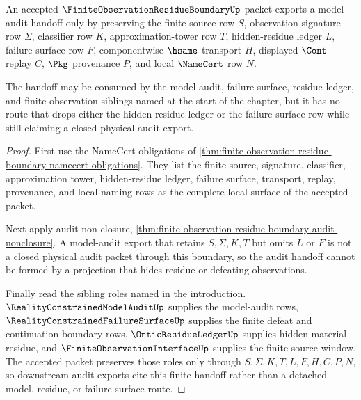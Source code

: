 \begin{theorem}
\label{thm:finite-observation-residue-boundary-audit-handoff}
An accepted $\FiniteObservationResidueBoundaryUp$ packet exports a model-audit handoff only by preserving the finite source row $S$, observation-signature row $\Sigma$, classifier row $K$, approximation-tower row $T$, hidden-residue ledger $L$, failure-surface row $F$, componentwise $\hsame$ transport $H$, displayed $\Cont$ replay $C$, $\Pkg$ provenance $P$, and local $\NameCert$ row $N$.

The handoff may be consumed by the model-audit, failure-surface, residue-ledger, and finite-observation siblings named at the start of the chapter, but it has no route that drops either the hidden-residue ledger or the failure-surface row while still claiming a closed physical audit export.
\end{theorem}
\begin{proof}
First use the NameCert obligations of \autoref{thm:finite-observation-residue-boundary-namecert-obligations}. They list the finite source, signature, classifier, approximation tower, hidden-residue ledger, failure surface, transport, replay, provenance, and local naming rows as the complete local surface of the accepted packet.

Next apply audit non-closure, \autoref{thm:finite-observation-residue-boundary-audit-nonclosure}. A model-audit export that retains $S,\Sigma,K,T$ but omits $L$ or $F$ is not a closed physical audit packet through this boundary, so the audit handoff cannot be formed by a projection that hides residue or defeating observations.

Finally read the sibling roles named in the introduction. $\RealityConstrainedModelAuditUp$ supplies the model-audit rows, $\RealityConstrainedFailureSurfaceUp$ supplies the finite defeat and continuation-boundary rows, $\OnticResidueLedgerUp$ supplies hidden-material residue, and $\FiniteObservationInterfaceUp$ supplies the finite source window. The accepted packet preserves those roles only through $S,\Sigma,K,T,L,F,H,C,P,N$, so downstream audit exports cite this finite handoff rather than a detached model, residue, or failure-surface route.
\end{proof}


